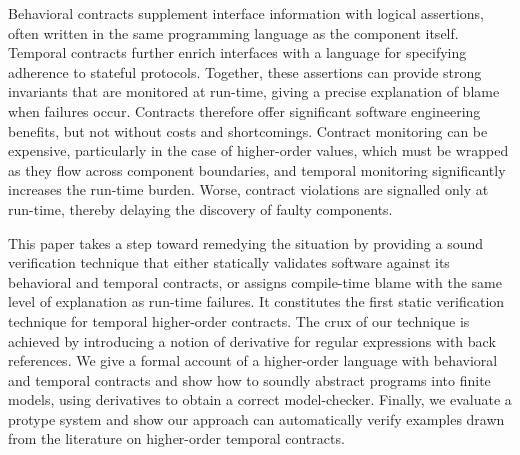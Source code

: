 Behavioral contracts supplement interface information with logical
assertions, often written in the same programming language as the
component itself.  
%
Temporal contracts further enrich interfaces with a language for
specifying adherence to stateful protocols.
%
Together, these assertions can provide strong invariants that are
monitored at run-time, giving a precise explanation of blame when
failures occur.
%
Contracts therefore offer significant software engineering benefits,
but not without costs and shortcomings.
%
Contract monitoring can be expensive, particularly in the case of
higher-order values, which must be wrapped as they flow across
component boundaries, and temporal monitoring significantly increases
the run-time burden.
%
Worse, contract violations are signalled only at run-time, thereby
delaying the discovery of faulty components.
%

This paper takes a step toward remedying the situation by providing a
sound verification technique that either statically validates software
against its behavioral and temporal contracts, or assigns compile-time
blame with the same level of explanation as run-time failures.
%
It constitutes the first static verification technique for temporal
higher-order contracts.
%
The crux of our technique is achieved by introducing a notion of
derivative for regular expressions with back references.
%
We give a formal account of a higher-order language with behavioral
and temporal contracts and show how to soundly abstract programs into
finite models, using derivatives to obtain a correct model-checker.
%
Finally, we evaluate a protype system and show our
approach can automatically verify examples drawn from the literature
on higher-order temporal contracts.
